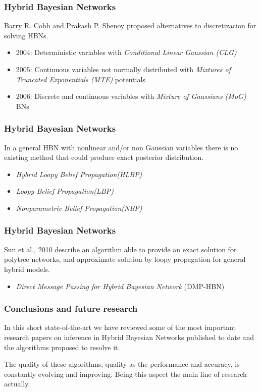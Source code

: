 \documentclass{beamer}
\begin{document}
\begin{frame}
	\frametitle{Hybrid Bayesian Networks}
	Barry R. Cobb and Prakash P. Shenoy proposed alternatives to discretizacion for solving HBNs.

	\begin{itemize}
		\item 2004: Deterministic variables with \textit{Conditional Linear Gaussian (CLG)} 

		\item 2005: Continuous variables not normally distributed with \textit{Mixtures of Truncated Exponentials (MTE)} potentials

		\item 2006: Discrete and continuous variables with \textit{Mixture of Gaussians (MoG)} BNs
	\end{itemize}
\end{frame}

\begin{frame}
	\frametitle{Hybrid Bayesian Networks}
	In a general HBN with nonlinear and/or non Gaussian variables there is no existing method that could produce exact posterior distribution.

	\begin{itemize}
		\item \textit{Hybrid Loopy Belief Propagation(HLBP)}

		\item \textit{Loopy Belief Propagation(LBP)}

		\item \textit{Nonparametric Belief Propagation(NBP)}
	\end{itemize}
\end{frame}

\begin{frame}
	\frametitle{Hybrid Bayesian Networks}
	Sun et al., 2010 describe an algorithm able to provide an exact solution for polytree networks, and approximate solution by loopy propagation for general hybrid models. 
	\begin{itemize}
		\item \textit{Direct Message Passing for Hybrid Bayesian Network} (DMP-HBN)
	\end{itemize}
\end{frame}

\begin{frame}
	\frametitle{Conclusions and future research}
In this short state-of-the-art we have reviewed some of the most important research papers on inference in Hybrid Bayesian Networks published to date and the algorithms proposed to resolve it.

The quality of these algorithms, quality as the performance and accuracy, is constantly evolving and improving. Being this aspect the main line of research actually.
\end{frame}
\end{document}
